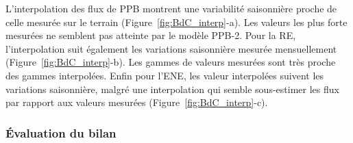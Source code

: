 L'interpolation des flux de PPB montrent une variabilité saisonnière proche de celle mesurée sur le terrain (Figure~\ref{fig:BdC_interp}-a). 
Les valeurs les plus forte mesurées ne semblent pas atteinte par le modèle PPB-2.
Pour la RE, l'interpolation suit également les variations saisonnière mesurée mensuellement (Figure~\ref{fig:BdC_interp}-b).
Les gammes de valeurs mesurées sont très proche des gammes interpolées.
Enfin pour l'ENE, les valeur interpolées suivent les variations saisonnière, malgré une interpolation qui semble sous-estimer les flux par rapport aux valeurs mesurées (Figure~\ref{fig:BdC_interp}-c).




\subsubsection{Évaluation du bilan}

